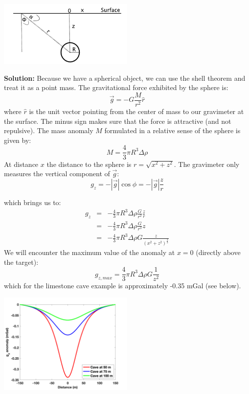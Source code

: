 \documentclass[a4paper,12pt]{article}
\newif\ifanswers
\begin{document}
\ifanswers
    \begin{tcolorbox}[enhanced jigsaw,breakable,pad at break*=1mm,
    colback=blue!5!white,colframe=babyblueeyes,title=Solutions]
     \begin{center}
       \includegraphics[width=0.5\textwidth]{Figures/Gravimetry/Gravimetry01_SphereSketchSolutions.png}
    \end{center}
    \textbf{Solution:} Because we have a spherical object, we can use the shell theorem and treat it as a point mass. The gravitational force exhibited by the sphere is:
    $$
    \vec{g} = -G\frac{M}{r^2}\hat{r}
    $$
    where $\hat{r}$ is the unit vector pointing from the center of mass to our gravimeter at the surface. The minus sign makes sure that the force is attractive (and not repulsive). The mass anomaly $M$ formulated in a relative sense of the sphere is given by:
    $$
    M = \frac{4}{3}\pi R^3 \Delta \rho
    $$
    At distance $x$ the distance to the sphere is $r=\sqrt{x^2+z^2}$. The gravimeter only measures the vertical component of $\vec{g}$:
    $$
    g_z = -|\vec{g}|\cos\phi = -|\vec{g}|\frac{z}{r}
    $$
  
    which brings us to:
    \begin{eqnarray*}
    g_z &=& -\frac{4}{3}\pi R^3 \Delta \rho \frac{G}{r^2} \frac{z}{r} \\
        &=& -\frac{4}{3}\pi R^3 \Delta \rho \frac{G}{r^3} z \\
        &=& -\frac{4}{3}\pi R^3 \Delta \rho G \frac{z}{(x^2+z^2)^\frac{3}{2}}
    \end{eqnarray*}
    We will encounter the maximum value of the anomaly at $x = 0$ (directly above the target):
    $$
    g_{z,max} = \frac{4}{3}\pi R^3 \Delta \rho G \frac{1}{z^2}
    $$
    which for the limestone cave example is approximately -0.35 mGal (see below).
    


    
    \begin{center}
        \includegraphics[width=0.5\textwidth]{Figures/Gravimetry/Gravimetry01_Visualization.png}
    \end{center}
 

\end{tcolorbox}
\end{document}
